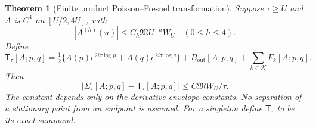 \documentclass[11pt]{article}
\numberwithin{equation}{section}
\newtheorem{theorem}{Theorem}[section]
\theoremstyle{definition}
\theoremstyle{remark}
\begin{document}
\begin{theorem}[Finite product Poisson--Fresnel transformation]
\label{tr:finite-product}
Suppose $\tau\ge U$ and $A$ is $C^4$ on $[U/2,4U]$, with
\[
 |A^{(h)}(u)|\le C_h\mathfrak M U^{-h}W_U
       \quad(0\le h\le4).
\]
Define
\begin{equation}
\label{tr:finite-main}
 \mathsf T_\tau[A;p,q]=
 \tfrac12\{A(p)e^{2i\tau\log p}+A(q)e^{2i\tau\log q}\}
 +B_{\mathrm{out}}[A;p,q]
 +\sum_{k\in\mathcal K}F_k[A;p,q].
\end{equation}
Then
\[
 |\Sigma_\tau[A;p,q]-\mathsf T_\tau[A;p,q]|
 \le C\mathfrak M W_U/\tau.
\]
The constant depends only on the derivative-envelope constants.  No
separation of a stationary point from an endpoint is assumed.  For a
singleton define $\mathsf T_\tau$ to be its exact summand.
\end{theorem}
\end{document}
